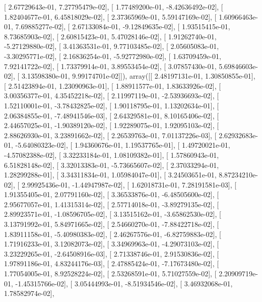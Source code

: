 \documentclass{article}
\begin{document}
       [ 2.67729643e-01,  7.27795479e-02],
       [ 1.77489200e-01, -8.42636492e-02],
       [ 1.82404677e-01,  6.45818029e-02],
       [ 2.37365969e-01,  5.59147169e-02],
       [ 1.60966463e-01,  7.69885277e-02],
       [ 2.67133084e-01, -9.12849635e-02],
       [ 1.93515415e-01,  8.73685903e-02],
       [ 2.60815423e-01,  5.47028146e-02],
       [ 1.91262740e-01, -5.27129880e-02],
       [ 3.41363531e-01,  9.77103485e-02],
       [ 2.05605083e-01, -3.30295771e-02],
       [ 2.16836254e-01, -5.92772980e-02],
       [ 1.63709459e-01,  7.92141722e-02],
       [ 1.73379914e-01,  3.89553454e-02],
       [ 3.07857430e-01,  5.69846603e-02],
       [ 3.13598380e-01,  9.99174701e-02]]), array([[ 2.48197131e-01,  1.30850855e-01],
       [ 2.51423894e-01,  1.23090963e-01],
       [ 1.88911577e-01,  1.83633926e-02],
       [ 3.00356377e-01,  4.35452218e-02],
       [ 2.11997119e-01, -2.53936693e-02],
       [ 1.52110001e-01, -3.78432825e-02],
       [ 1.90118795e-01,  1.13202634e-01],
       [ 2.06384855e-01, -7.48941546e-03],
       [ 2.64329581e-01,  8.10165406e-02],
       [ 2.44657025e-01, -1.90389120e-02],
       [ 1.92289075e-01,  1.92095103e-02],
       [ 2.88626930e-01,  3.23891662e-02],
       [ 2.26539763e-01,  7.01137226e-03],
       [ 2.62932683e-01, -5.64080323e-02],
       [ 1.94360676e-01,  1.19537765e-01],
       [ 1.49720021e-01, -4.57082388e-02],
       [ 3.32233184e-01,  1.08109382e-01],
       [ 1.57860943e-01,  6.51828148e-02],
       [ 3.32013383e-01, -5.73665607e-02],
       [ 2.37033294e-01,  1.28299288e-01],
       [ 3.34311834e-01,  1.05984047e-01],
       [ 3.24503651e-01,  8.87234210e-02],
       [ 2.99925436e-01, -1.44947987e-02],
       [ 1.62018731e-01,  7.28191581e-03],
       [ 1.91355405e-01,  2.07791160e-02],
       [ 3.36533876e-01, -6.48505600e-02],
       [ 2.95677057e-01,  1.41315314e-02],
       [ 2.57714018e-01, -3.89279135e-02],
       [ 2.89923571e-01, -1.08596705e-02],
       [ 3.13515162e-01, -3.65862530e-02],
       [ 3.13791992e-01,  5.84971665e-02],
       [ 2.54660270e-01, -7.88422718e-02],
       [ 1.83911158e-01, -5.40980383e-02],
       [ 2.46267576e-01, -6.82759883e-02],
       [ 1.71916233e-01,  3.12082073e-02],
       [ 3.34969963e-01, -4.29073103e-02],
       [ 3.23229265e-01, -2.64508916e-03],
       [ 2.71338746e-01,  2.91530836e-02],
       [ 1.97891186e-01,  4.83244176e-03],
       [ 2.47885424e-01, -7.17673480e-02],
       [ 1.77054005e-01,  8.92528224e-02],
       [ 2.53268591e-01,  5.71027559e-02],
       [ 2.20909719e-01, -1.45315766e-02],
       [ 3.05444993e-01, -8.51934546e-02],
       [ 3.46932068e-01,  1.78582974e-02],
\end{document}
